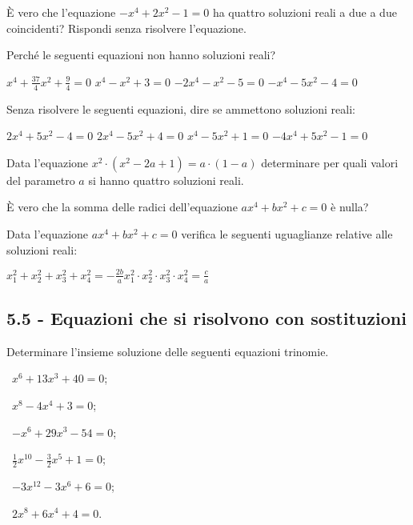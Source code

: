 \begin{esercizio}
 \label{ese:5.26}
È vero che l’equazione $-x^4+2x^2-1=0$ ha quattro soluzioni reali a due a due coincidenti? Rispondi senza risolvere l'equazione.
\end{esercizio}

\begin{esercizio}
 \label{ese:5.27}
Perché le seguenti equazioni non hanno soluzioni reali?

\boxA\; $x^4+\frac{37} 4x^2+\frac 9 4=0$\quad \boxB\; $x^4-x^2+3=0$\quad\boxC\; $-2x^4-x^2-5=0$\quad\boxD\; $-x^4-5x^2-4=0$
\end{esercizio}

\begin{esercizio}[\Ast]
 \label{ese:5.28}
Senza risolvere le seguenti equazioni, dire se ammettono soluzioni reali:

\boxA\; $2x^4+5x^2-4=0$\quad \boxB\; $2x^4-5x^2+4=0$\quad\boxC\; $x^4-5x^2+1=0$\quad\boxD\; $-4x^4+5x^2-1=0$
\end{esercizio}

\begin{esercizio}[\Ast]
 \label{ese:5.29}
Data l'equazione $x^2\cdot \left(x^2-2a+1\right)=a\cdot (1-a)$ determinare per quali valori del parametro $a$ si hanno quattro soluzioni reali.
\end{esercizio}

\begin{esercizio}
 \label{ese:5.30}
È vero che la somma delle radici dell’equazione $ax^4+bx^2+c=0$ è nulla?
\end{esercizio}

\begin{esercizio}
 \label{ese:5.31}
Data l’equazione $ax^4+bx^2+c=0$ verifica le seguenti uguaglianze relative alle soluzioni reali:

\boxA\quad $x_1^2+x_2^2+x_3^2+x_4^2=-\frac{2b} a$\qquad \boxB\quad $x_1^2\cdot x_2^2\cdot x_3^2\cdot x_4^2=\frac c a$
\end{esercizio}

\subsection*{5.5 - Equazioni che si risolvono con sostituzioni}

\begin{esercizio}
 \label{ese:5.32}
Determinare l'insieme soluzione delle seguenti equazioni trinomie.
\begin{multicols}{2}
 \begin{enumeratea}
 \item~$x^6+13x^3+40=0$;
 \item~$x^8-4x^4+3=0$;
 \item~$-x^6+29x^3-54=0$;
 \item~$\frac 1 2x^{10}-\frac 3 2x^5+1=0$;
 \item~$-3x^{12}-3x^6+6=0$;
 \item~$2x^8+6x^4+4=0$.
 \end{enumeratea}
\end{multicols}
\end{esercizio}

